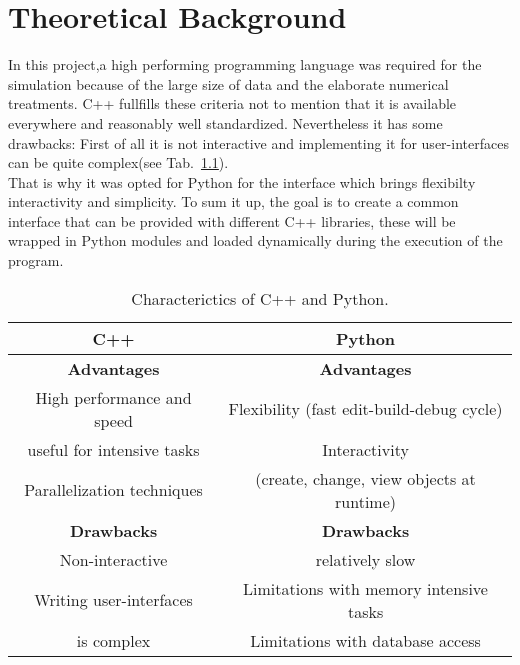 \chapter{Theoretical Background}
\label{chapter:theory}
In this project,a high performing programming language was required for the simulation because of the large size of data and the elaborate numerical treatments. C++ fullfills these criteria not to mention that it is available everywhere and reasonably well standardized. Nevertheless it has some drawbacks: First of all it is not interactive and implementing it for user-interfaces can be quite complex(see Tab.~\ref{table:settings}).\\
That is why it was opted for Python for the interface which brings flexibilty interactivity and simplicity.
To sum it up, the goal is to create a common interface that can be provided with different C++ libraries, these will be wrapped in Python modules and loaded dynamically during the execution of the program.\\



\begin{table}[htb]
\centering
\begin{tabular}{|cc|}
\hline
\textbf{C++} & \textbf{Python}\\
\hline
\textbf{Advantages} & \textbf{Advantages} \\
High performance and speed & Flexibility (fast edit-build-debug cycle)
\\useful for intensive tasks & Interactivity\\

Parallelization techniques & (create, change, view objects at runtime) \\

\textbf{Drawbacks} & \textbf{Drawbacks} \\

Non-interactive & relatively slow\\
Writing user-interfaces & Limitations with memory intensive tasks\\
is complex &  Limitations with database access\\
\hline
\end{tabular}
\caption{Characterictics of C++ and Python.\label{table:settings}}

\end{table}
